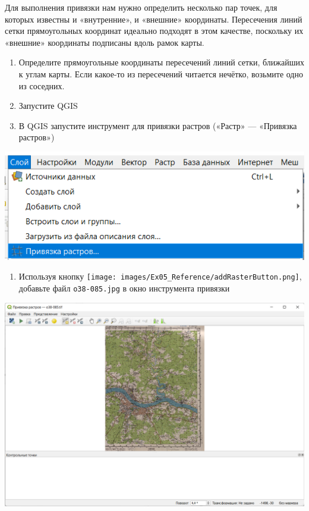 \documentclass[
  12pt,
]{book}
\providecommand{\tightlist}{%
  \setlength{\itemsep}{0pt}\setlength{\parskip}{0pt}}
\begin{document}
Для выполнения привязки нам нужно определить несколько пар точек, для которых известны и «внутренние», и «внешние» координаты. Пересечения линий сетки прямоугольных координат идеально подходят в этом качестве, поскольку их «внешние» координаты подписаны вдоль рамок карты.

\begin{enumerate}
\def\labelenumi{\arabic{enumi}.}
\setcounter{enumi}{2}
\item
  Определите прямоугольные координаты пересечений линий сетки, ближайших к углам карты. Если какое-то из пересечений читается нечётко, возьмите одно из соседних.
\item
  Запустите QGIS
\item
  В QGIS запустите инструмент для привязки растров («Растр» --- «Привязка растров»)
\end{enumerate}

\includegraphics{images/Ex05_Reference/RasterReference0.png}

\begin{enumerate}
\def\labelenumi{\arabic{enumi}.}
\setcounter{enumi}{5}
\tightlist
\item
  Используя кнопку \texttt{[image: images/Ex05\_Reference/addRasterButton.png]}, добавьте файл \texttt{o38-085.jpg} в окно инструмента привязки
\end{enumerate}

\includegraphics{images/Ex05_Reference/RasterReference1.png}
\end{document}

